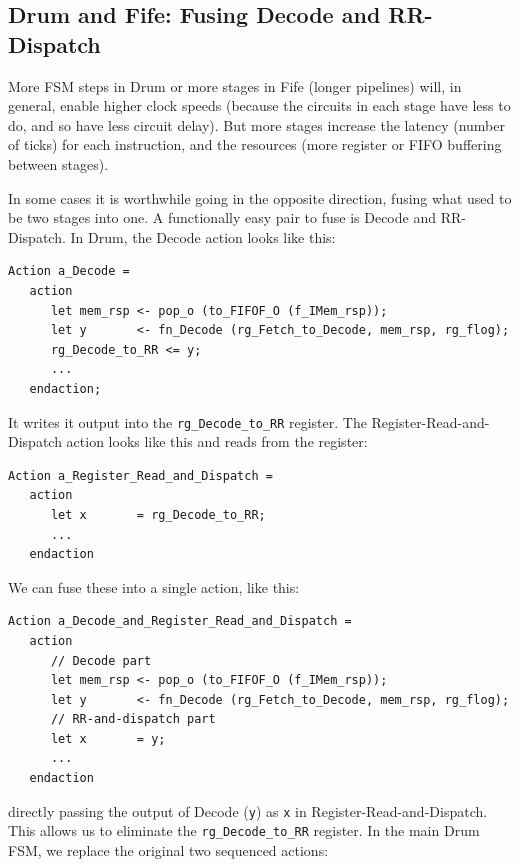 
\subsection{Drum and Fife: Fusing Decode and RR-Dispatch}

\label{Sec_Fuse_Decode_RR}

More FSM steps in Drum or more stages in Fife (longer pipelines) will,
in general, enable higher clock speeds (because the circuits in each
stage have less to do, and so have less circuit delay).  But more
stages increase the latency (number of ticks) for each instruction,
and the resources (more register or FIFO buffering between stages).

In some cases it is worthwhile going in the opposite direction, fusing
what used to be two stages into one.  A functionally easy pair to fuse
is Decode and RR-Dispatch.  In Drum, the Decode action looks like
this:

{\small
\begin{Verbatim}[frame=single, label=src\_Drum/CPU.bsv]
   Action a_Decode =
   action
      let mem_rsp <- pop_o (to_FIFOF_O (f_IMem_rsp));
      let y       <- fn_Decode (rg_Fetch_to_Decode, mem_rsp, rg_flog);
      rg_Decode_to_RR <= y;
      ...
   endaction;
\end{Verbatim}
}

It writes it output into the \verb|rg_Decode_to_RR| register.  The
Register-Read-and-Dispatch action looks like this and reads from the
register:

{\small
\begin{Verbatim}[frame=single, label=src\_Drum/CPU.bsv]
   Action a_Register_Read_and_Dispatch =
   action
      let x       = rg_Decode_to_RR;
      ...
   endaction
\end{Verbatim}
}

We can fuse these into a single action, like this:

{\small
\begin{Verbatim}[frame=single]
   Action a_Decode_and_Register_Read_and_Dispatch =
   action
      // Decode part
      let mem_rsp <- pop_o (to_FIFOF_O (f_IMem_rsp));
      let y       <- fn_Decode (rg_Fetch_to_Decode, mem_rsp, rg_flog);
      // RR-and-dispatch part
      let x       = y;
      ...
   endaction
\end{Verbatim}
}

directly passing the output of Decode (\verb|y|) as \verb|x| in
Register-Read-and-Dispatch.  This allows us to eliminate the
\verb|rg_Decode_to_RR| register.  In the main Drum FSM, we replace the
original two sequenced actions:

